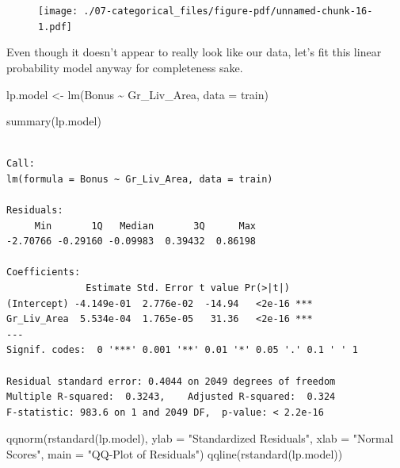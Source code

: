 \documentclass[
  letterpaper,
  DIV=11,
  numbers=noendperiod]{scrreprt}
\newenvironment{Shaded}{\begin{snugshade}}{\end{snugshade}}
\newcommand{\AttributeTok}[1]{\textcolor[rgb]{0.40,0.45,0.13}{#1}}
\newcommand{\FunctionTok}[1]{\textcolor[rgb]{0.28,0.35,0.67}{#1}}
\newcommand{\NormalTok}[1]{\textcolor[rgb]{0.00,0.23,0.31}{#1}}
\newcommand{\OtherTok}[1]{\textcolor[rgb]{0.00,0.23,0.31}{#1}}
\newcommand{\SpecialCharTok}[1]{\textcolor[rgb]{0.37,0.37,0.37}{#1}}
\newcommand{\StringTok}[1]{\textcolor[rgb]{0.13,0.47,0.30}{#1}}
\begin{document}
\begin{figure}[H]

{\centering \texttt{[image: ./07-categorical\_files/figure-pdf/unnamed-chunk-16-1.pdf]}

}

\end{figure}

Even though it doesn't appear to really look like our data, let's fit
this linear probability model anyway for completeness sake.

\begin{Shaded}
\begin{Highlighting}[]
\NormalTok{lp.model }\OtherTok{\textless{}{-}} \FunctionTok{lm}\NormalTok{(Bonus }\SpecialCharTok{\textasciitilde{}}\NormalTok{ Gr\_Liv\_Area, }\AttributeTok{data =}\NormalTok{ train)}

\FunctionTok{summary}\NormalTok{(lp.model)}
\end{Highlighting}
\end{Shaded}

\begin{verbatim}

Call:
lm(formula = Bonus ~ Gr_Liv_Area, data = train)

Residuals:
     Min       1Q   Median       3Q      Max 
-2.70766 -0.29160 -0.09983  0.39432  0.86198 

Coefficients:
              Estimate Std. Error t value Pr(>|t|)    
(Intercept) -4.149e-01  2.776e-02  -14.94   <2e-16 ***
Gr_Liv_Area  5.534e-04  1.765e-05   31.36   <2e-16 ***
---
Signif. codes:  0 '***' 0.001 '**' 0.01 '*' 0.05 '.' 0.1 ' ' 1

Residual standard error: 0.4044 on 2049 degrees of freedom
Multiple R-squared:  0.3243,    Adjusted R-squared:  0.324 
F-statistic: 983.6 on 1 and 2049 DF,  p-value: < 2.2e-16
\end{verbatim}

\begin{Shaded}
\begin{Highlighting}[]
\FunctionTok{qqnorm}\NormalTok{(}\FunctionTok{rstandard}\NormalTok{(lp.model),}
       \AttributeTok{ylab =} \StringTok{"Standardized Residuals"}\NormalTok{,}
       \AttributeTok{xlab =} \StringTok{"Normal Scores"}\NormalTok{,}
       \AttributeTok{main =} \StringTok{"QQ{-}Plot of Residuals"}\NormalTok{)}
\FunctionTok{qqline}\NormalTok{(}\FunctionTok{rstandard}\NormalTok{(lp.model))}
\end{Highlighting}
\end{Shaded}
\end{document}
